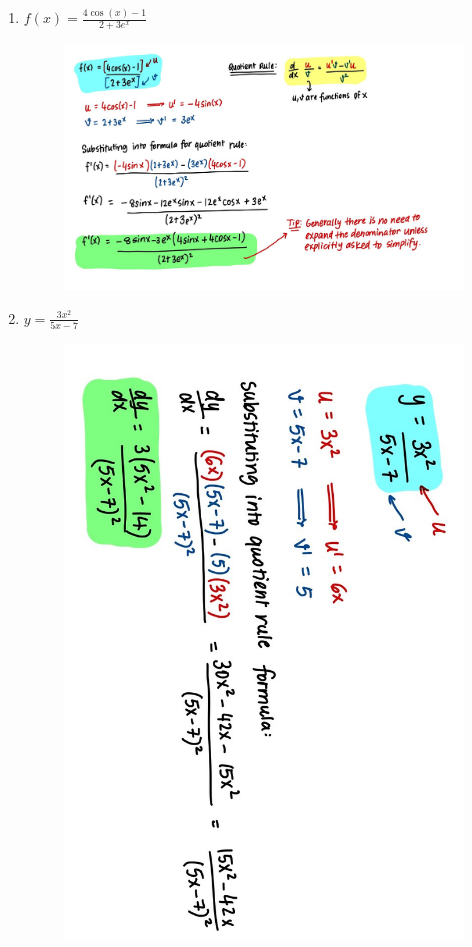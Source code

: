 \documentclass{article}
\begin{document}
\begin{enumerate}
    \item $f(x) = \frac{4 \cos(x) - 1}{2+3e^x}$
    \begin{figure}[H]
        \centering
        \includegraphics[width= 0.9\linewidth]{Q2.1.jpg}
        \label{fig:Q2.1}
    \end{figure}
    \item $y = \frac{3x^2}{5x-7}$
    \begin{figure}[H]
        \centering
        \includegraphics[width= 0.7\linewidth]{Q2.2.jpg}
        \label{fig:Q2.2}
    \end{figure}

\end{enumerate}
\end{document}
